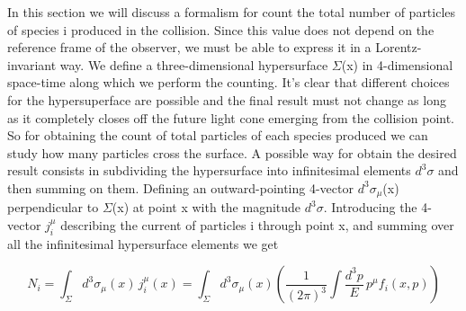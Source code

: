 \documentclass[12pt,a4paper]{book}
\begin{document}
	In this section we will discuss a formalism for count the total number of particles of species i produced in the collision. Since this value does not depend on the reference frame of the observer, we must be able to express it in a Lorentz-invariant way. We define a three-dimensional hypersurface $\Sigma$(x) in 4-dimensional space-time along which we perform the counting. It's clear that different choices for the hypersuperface are possible and the final result must not change as long as it completely closes off the future light cone emerging from the collision point. So for obtaining the count of total particles of each species produced we can study how many particles cross the surface. A possible way for obtain the desired result consists in subdividing the hypersurface into infinitesimal elements $d^3 \sigma$ and then summing on them. Defining an outward-pointing 4-vector $d^3 \sigma_\mu$(x) perpendicular to $\Sigma$(x) at point x with the magnitude $d^3 \sigma$. Introducing the 4-vector $j^\mu_i$ describing the current of particles i through point x, and summing over all the infinitesimal hypersurface elements we get
	
	\begin{equation}
		\boxed{	N_i = \int_{\Sigma} d^3 \sigma_\mu(x) \, j_i^\mu(x) = \int_{\Sigma} d^3 \sigma_\mu(x) \left( \frac{1}{(2\pi)^3} \int \frac{d^3 p}{E} \, p^\mu f_i(x,p) \right)}
		\label{eq:particle_number}
	\end{equation}
	
\end{document}
